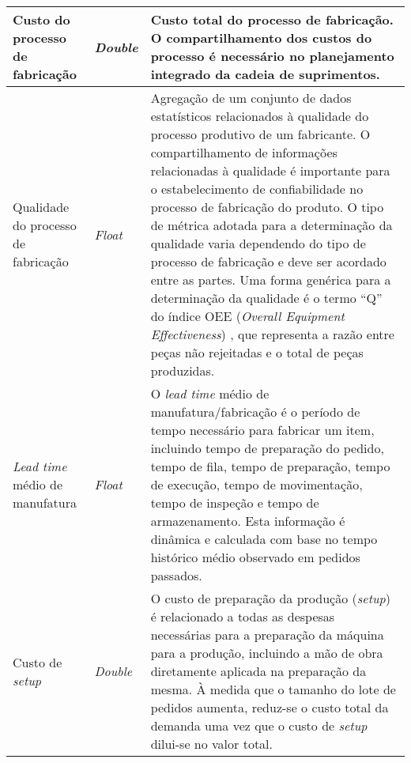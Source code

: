 \begin{longtable}{p{} p{} p{}}
	\hline
	Custo do processo de fabricação
	 & \textit{Double}
	 & Custo total do processo de fabricação. O compartilhamento dos custos do processo é necessário no planejamento integrado da cadeia de suprimentos.                                                                                                                                                                                                                                                                                                                                                                                                                                                                                                              \\
	\hline
	Qualidade do processo de fabricação
	 & \textit{Float}
	 & Agregação de um conjunto de dados estatísticos relacionados à qualidade do processo produtivo de um fabricante. O compartilhamento de informações relacionadas à qualidade é importante para o estabelecimento de confiabilidade no processo de fabricação do produto. O tipo de métrica adotada para a determinação da qualidade varia dependendo do tipo de processo de fabricação e deve ser acordado entre as partes. Uma forma genérica para a determinação da qualidade é o termo ``Q'' do índice OEE (\textit{Overall Equipment Effectiveness}) \cite{corrales2020oee}, que representa a razão entre peças não rejeitadas e o total de peças produzidas. \\


	\hline
	\textit{Lead time} médio de manufatura
	 & \textit{Float}
	 & O \textit{lead time} médio de manufatura/fabricação é o período de tempo necessário para fabricar um item, incluindo tempo de preparação do pedido, tempo de fila, tempo de preparação, tempo de execução, tempo de movimentação, tempo de inspeção e tempo de armazenamento. Esta informação é dinâmica e calculada com base no tempo histórico médio observado em pedidos passados.                                                                                                                                                                                                                                                                          \\

	\hline
	Custo de \textit{setup}
	 & \textit{Double}
	 & O custo de preparação da produção (\textit{setup}) é relacionado a todas as despesas necessárias para a preparação da máquina para a produção, incluindo a mão de obra diretamente aplicada na preparação da mesma. À medida que o tamanho do lote de pedidos aumenta, reduz-se o custo total da demanda uma vez que o custo de \textit{setup} dilui-se no valor total.                                                                                                                                                                                                                                                                                        \\


\end{longtable}
